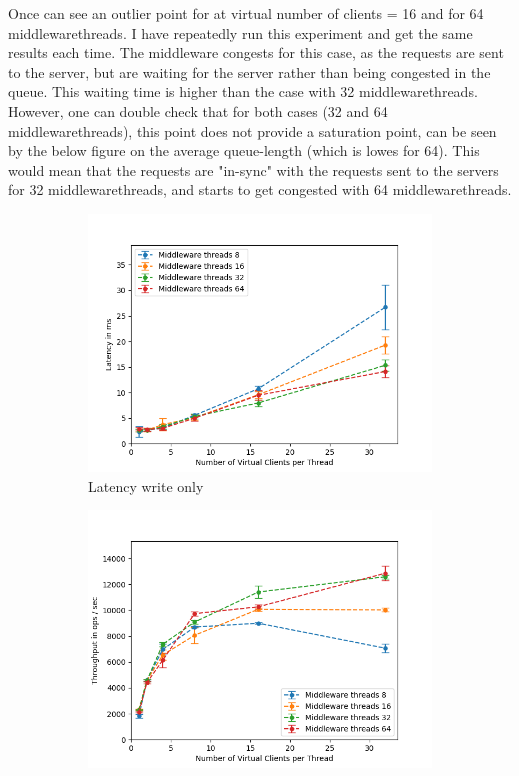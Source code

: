 \documentclass[11pt,a4paper]{article}
\begin{document}
Once can see an outlier point for at virtual number of clients = 16 and for 64 middlewarethreads. 
I have repeatedly run this experiment and get the same results each time.
The middleware congests for this case, as the requests are sent to the server, but are waiting for the server rather than being congested in the queue.
This waiting time is higher than the case with 32 middlewarethreads.
However, one can double check that for both cases (32 and 64 middlewarethreads), this point does not provide a saturation point, can be seen by the below figure on the average queue-length (which is lowes for 64).
This would mean that the requests are "in-sync" with the requests sent to the servers for 32 middlewarethreads, and starts to get congested with 64 middlewarethreads.

\begin{figure}[H]
\centering
\begin{subfigure}{.5\textwidth}
    \centering
    \includegraphics[width=\textwidth]{img/exp4_1/exp4_1__vc_64__latency_client_write_1.png}
    \caption{Latency write only}
    \label{fig:mesh1}
\end{subfigure}%
\begin{subfigure}{.5\textwidth}
      \centering
    \includegraphics[width=\textwidth]{img/exp4_1/exp4_1__vc_64__throughput_client_write_1.png}

\end{subfigure}
\end{figure}
\end{document}

